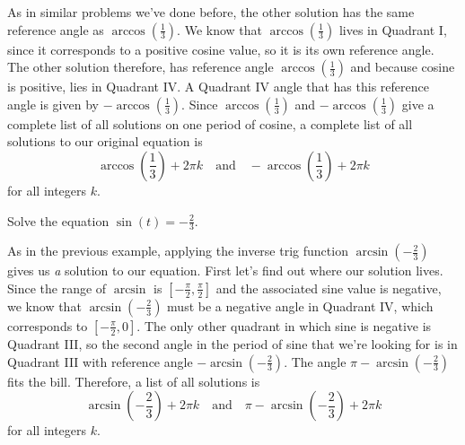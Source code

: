 \documentclass{ximera}
\begin{document}
\begin{example}
\begin{explanation}
As in similar problems we've done before, the other solution has the same reference angle as $\arccos\left(\frac{1}{3}\right)$. We know that $\arccos\left(\frac{1}{3}\right)$ lives in Quadrant I, since it corresponds to a positive cosine value, so it is its own reference angle. The other solution therefore, has reference angle $\arccos\left(\frac{1}{3}\right)$ and because cosine is positive, lies in Quadrant IV. A Quadrant IV angle that has this reference angle is given by $-\arccos\left(\frac{1}{3}\right)$. Since $\arccos\left(\frac{1}{3}\right)$ and $-\arccos\left(\frac{1}{3}\right)$ give a complete list of all solutions on one period of cosine, a complete list of all solutions to our original equation is 
$$\arccos\left(\frac{1}{3}\right) + 2\pi k \quad \text{and} \quad-\arccos\left(\frac{1}{3}\right) + 2\pi k$$
 for all integers $k$.
\end{explanation}
\end{example}

\begin{example}
Solve the equation $\sin(t) = -\frac{2}{3}$. 

\begin{explanation}
As in the previous example, applying the inverse trig function $\arcsin\left(-\frac{2}{3}\right)$ gives us \emph{a} solution to our equation. First let's find out where our solution lives. Since the range of $\arcsin$ is $\left[-\frac{\pi}{2}, \frac{\pi}{2}\right]$ and the associated sine value is negative, we know that $\arcsin\left(-\frac{2}{3}\right)$ must be a negative angle in Quadrant IV, which corresponds to $\left[-\frac{\pi}{2}, 0\right]$. The only other quadrant in which sine is negative is Quadrant III, so the second angle in the period of sine that we're looking for is in Quadrant III with reference angle $-\arcsin\left(-\frac{2}{3}\right)$. The angle $\pi - \arcsin\left(-\frac{2}{3}\right)$ fits the bill. Therefore, a list of all solutions is 
$$\arcsin\left(-\frac{2}{3}\right) + 2\pi k\quad \text{and} \quad \pi - \arcsin\left(-\frac{2}{3}\right) + 2\pi k$$
for all integers $k$. 
\end{explanation}
\end{example}
\end{document}

